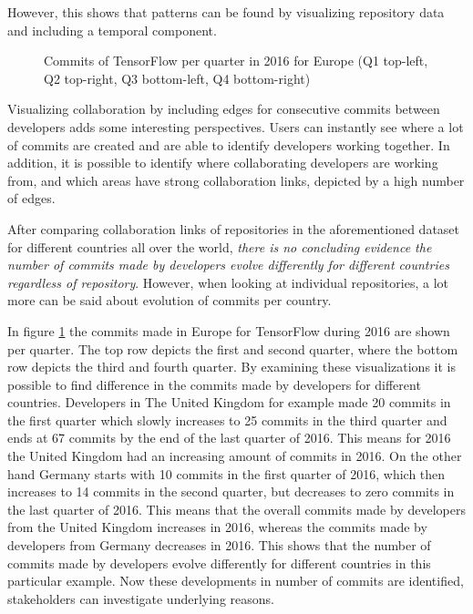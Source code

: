 \documentclass[acmtog, authorversion]{acmart}
\begin{document}
However, this shows that patterns can be found by visualizing repository data  and including a temporal component.

\begin{figure}
\caption{Commits of TensorFlow per quarter in 2016 for Europe (Q1 top-left, Q2 top-right, Q3 bottom-left, Q4 bottom-right) }
\label{fig:tensorflow-2016}
\end{figure}

Visualizing collaboration by including edges for consecutive commits between developers adds some interesting perspectives.
Users can instantly see where a lot of commits are created and are able to identify developers working together.
In addition, it is possible to identify where collaborating developers are working from, and which areas have strong collaboration links, depicted by a high number of edges.

After comparing collaboration links of repositories in the aforementioned dataset for different countries all over the world, \textit{there is no concluding evidence the number of commits made by developers evolve differently for different countries regardless of repository}.
However, when looking at individual repositories, a lot more can be said about evolution of commits per country.

In figure \ref{fig:tensorflow-2016} the commits made in Europe for TensorFlow \cite{TensorFlow} during 2016 are shown per quarter.
The top row depicts the first and second quarter, where the bottom row depicts the third and fourth quarter.
By examining these visualizations it is possible to find difference in the commits made by developers for different countries. 
Developers in The United Kingdom for example made 20 commits in the first quarter which slowly increases to 25 commits in the third quarter and ends at 67 commits by the end of the last quarter of 2016.
This means for 2016 the United Kingdom had an increasing amount of commits in 2016.
On the other hand Germany starts with 10 commits in the first quarter of 2016, which then increases to 14 commits in the second quarter, but decreases to zero commits in the last quarter of 2016.
This means that the overall commits made by developers from the United Kingdom increases in 2016, whereas the commits made by developers from Germany decreases in 2016.
This shows that the number of commits made by developers evolve differently for different countries in this particular example.
Now these developments in number of commits are identified, stakeholders can investigate underlying reasons.
\end{document}
